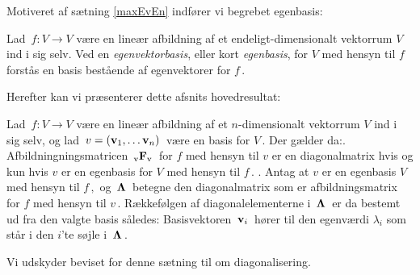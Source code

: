 Motiveret af sætning \ref{maxEvEn} indfører vi begrebet egenbasis:
 
\begin{definition}[Egenvektorbasis]
Lad $\,f:V\rightarrow V$ være en lineær afbildning af et endeligt-dimensionalt vektorrum $V$ ind i sig selv.\bs
Ved en \textit{egenvektorbasis}, eller kort \textit{egenbasis}, for $V$ med hensyn til $f$ forstås en basis bestående af egenvektorer for $f\,$.
\end{definition}

Herefter kan vi præsenterer dette afsnits hovedresultat:

\begin{theorem}[Hovedsætning]\label{MainTh}
Lad $\,f:V\rightarrow V$ være en lineær afbildning af et $n$-dimensionalt vektorrum $V$ ind i sig selv, og lad $\,v=(\mathbf{v}_1,\ldots\mathbf{v}_n)\,$ være en basis for $V\,.$ Der gælder da:. Afbildningningsmatricen $\,{_\mathrm{v}\mathbf{F}_\mathrm{v}}\,$ for $f$ med hensyn til $v$ er en diagonalmatrix hvis og kun hvis $v$ er en egenbasis for $V$ med hensyn til $f\,$. . Antag at $v$ er en egenbasis $V$ med hensyn til $f\,,$ og $\,\bm{\Lambda}\,$ betegne den diagonalmatrix som er afbildningsmatrix for $f$ med hensyn til $v\,.$ Rækkefølgen af diagonalelementerne i $\,\bm{\Lambda}\,$ er da bestemt ud fra den valgte basis således: Basisvektoren $\,\mathbf{v}_i\,$ hører til den egenværdi $\lambda_i$ som står i den $ i $'te søjle i $\,\bm{\Lambda}\,$. 
\end{theorem}

Vi udskyder beviset for denne sætning til  om diagonalisering.

